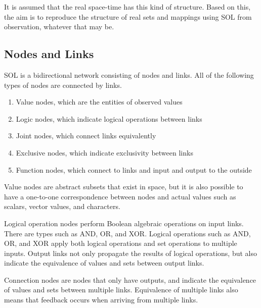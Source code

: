 \documentclass[12pt]{article}
\begin{document}
It is assumed that the real space-time has this kind of structure. Based
on this, the aim is to reproduce the structure of real sets and mappings
using SOL from observation, whatever that may be.

\subsection{Nodes and Links}\label{nodes-and-links}

SOL is a bidirectional network consisting of nodes and links. All of the
following types of nodes are connected by links.

\begin{enumerate}
\def\labelenumi{\arabic{enumi}.}

\item
  Value nodes, which are the entities of observed values
\item
  Logic nodes, which indicate logical operations between links
\item
  Joint nodes, which connect links equivalently
\item
  Exclusive nodes, which indicate exclusivity between links
\item
  Function nodes, which connect to links and input and output to the
  outside
\end{enumerate}

Value nodes are abstract subsets that exist in space, but it is also
possible to have a one-to-one correspondence between nodes and actual
values \hspace{0pt}\hspace{0pt}such as scalars, vector values, and
characters.

Logical operation nodes perform Boolean algebraic operations on input
links. There are types such as AND, OR, and XOR. Logical operations such
as AND, OR, and XOR apply both logical operations and set operations to
multiple inputs. Output links not only propagate the results of logical
operations, but also indicate the equivalence of values
\hspace{0pt}\hspace{0pt}and sets between output links.

Connection nodes are nodes that only have outputs, and indicate the
equivalence of values \hspace{0pt}\hspace{0pt}and sets between multiple
links. Equivalence of multiple links also means that feedback occurs
when arriving from multiple links.
\end{document}
